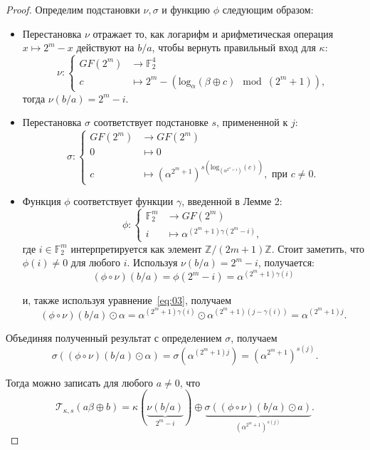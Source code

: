 \begin{proof}
Определим подстановки \(\nu, \sigma\) и функцию \(\phi\) следующим образом:

\begin{itemize}
  \item Перестановка \(\nu\) отражает то, как логарифм и арифметическая операция \(x \mapsto 2^m - x\) действуют на \(b/a\), чтобы вернуть правильный вход для \(\kappa\):
  \[
  \nu :
  \begin{cases}
  GF(2^m) & \to \mathbb{F}^4_2 \\
  c & \mapsto 2^m - (\mathrm{log}_{\alpha}(\beta \oplus c) \mod (2^m + 1)),
  \end{cases}
  \]
  тогда \(\nu(b/a) = 2^m - i\).

  \item Перестановка \(\sigma\) соответствует подстановке \(s\), примененной к \(j\):
  \[
  \sigma :
  \begin{cases}
  GF(2^m) & \to GF(2^m) \\
  0 & \mapsto 0 \\
  c & \mapsto (\alpha^{2^m+1})^{s(\mathrm{log}_{(\alpha^{2^m+1})}(c))}, \text{ при } c \neq 0.
  \end{cases}
  \]

  \item Функция \(\phi\) соответствует функции \(\gamma\), введенной в Лемме 2:
  \[
  \phi :
  \begin{cases}
  \mathbb{F}^m_2 & \to GF(2^m) \\
  i & \mapsto \alpha^{(2^m+1)\gamma(2^m-i)},
  \end{cases}
  \]
  где \(i \in \mathbb{F}^m_2\) интерпретируется как элемент \(\mathbb{Z}/(2m + 1)\mathbb{Z}\). Стоит заметить, что \(\phi(i) \neq 0\) для любого \(i\). Используя \(\nu(b/a) = 2^m - i\), получается:
  \[
  (\phi \circ \nu)(b/a) = \phi(2^m - i) = \alpha^{(2^m+1)\gamma(i)}
  \]

  и, также используя уравнение~\ref{eq:03}, получаем
  \[
  (\phi \circ \nu)(b/a) \odot \alpha = \alpha^{(2^m+1)\gamma(i)} \odot \alpha^{(2^m+1)(j-\gamma(i))} = \alpha^{(2^m+1)j}.
  \]
\end{itemize}

  Объединяя полученный результат с определением \(\sigma\), получаем
  \[
  \sigma((\phi \circ \nu)(b/a) \odot \alpha) = \sigma(\alpha^{(2^m+1)j}) = (\alpha^{2^m+1})^{s(j)}.
  \]

Тогда можно записать для любого \(a \neq 0\), что
\[
  \mathscr{T}_{\kappa, s}(a \beta \oplus b)=\kappa(\underbrace{\nu(b / a)}_{2^m-i}) \oplus \underbrace{\sigma((\phi \circ \nu)(b / a) \odot a)}_{\left(\alpha^{2^m+1}\right)^{s(j)}} .
\]


\end{proof}
